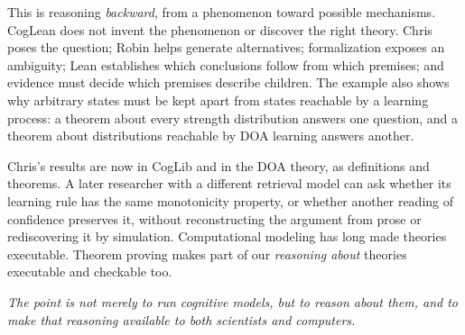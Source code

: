\documentclass[11pt]{article}
\begin{document}
This is reasoning \emph{backward}, from a phenomenon toward possible mechanisms. CogLean does not invent the phenomenon or discover the right theory. Chris poses the question; Robin helps generate alternatives; formalization exposes an ambiguity; Lean establishes which conclusions follow from which premises; and evidence must decide which premises describe children. The example also shows why arbitrary states must be kept apart from states reachable by a learning process: a theorem about every strength distribution answers one question, and a theorem about distributions reachable by DOA learning answers another.

Chris's results are now in CogLib and in the DOA theory, as definitions and theorems. A later researcher with a different retrieval model can ask whether its learning rule has the same monotonicity property, or whether another reading of confidence preserves it, without reconstructing the argument from prose or rediscovering it by simulation. Computational modeling has long made theories executable. Theorem proving makes part of our \emph{reasoning about} theories executable and checkable too.

\begin{center}
\emph{The point is not merely to run cognitive models, but to reason about them, and to make that reasoning available to both scientists and computers.}
\end{center}
\end{document}
